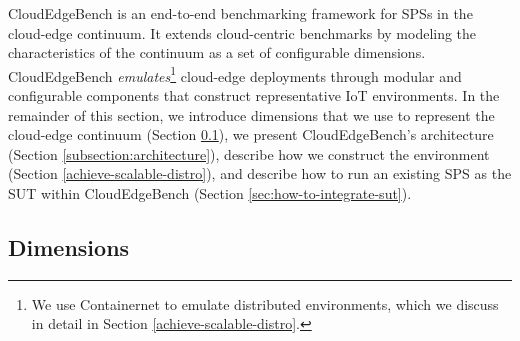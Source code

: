 \documentclass[runningheads]{llncs}
\begin{document}
CloudEdgeBench is an end-to-end benchmarking framework for SPSs in the cloud-edge continuum. %
It extends cloud-centric benchmarks by modeling the characteristics of the continuum as a set of configurable dimensions.
CloudEdgeBench \textit{emulates}\footnote{We use Containernet\cite{containernet} to emulate distributed environments, which we discuss in detail in Section \ref{achieve-scalable-distro}.} cloud-edge deployments through modular and configurable components that construct representative IoT environments.
In the remainder of this section, we introduce dimensions that we use to represent the cloud-edge continuum (Section \ref{dimensions}), we present CloudEdgeBench's architecture (Section \ref{subsection:architecture}), describe how we construct the environment (Section \ref{achieve-scalable-distro}), and describe how to run an existing SPS as the SUT within CloudEdgeBench (Section \ref{sec:how-to-integrate-sut}).

\subsection{Dimensions} \label{dimensions}
\end{document}

